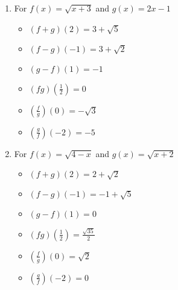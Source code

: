 \begin{enumerate}
\item For $f(x) = \sqrt{x+3}$ and  $g(x) = 2x-1$

\begin{multicols}{3}
\begin{itemize}

\item  $(f+g)(2) = 3+\sqrt{5}$
\item  $(f-g)(-1) = 3+\sqrt{2}$
\item  $(g-f)(1) = -1$

\end{itemize}
\end{multicols}

\begin{multicols}{3}
\begin{itemize}

\item  $(fg)\left(\frac{1}{2}\right) = 0$
\item  $\left(\frac{f}{g}\right)(0) = -\sqrt{3}$
\item  $\left(\frac{g}{f}\right)\left(-2\right) = -5$

\end{itemize}
\end{multicols}

\item For $f(x) = \sqrt{4-x}$ and $g(x) = \sqrt{x+2}$

\begin{multicols}{3}
\begin{itemize}

\item  $(f+g)(2) = 2+\sqrt{2}$
\item  $(f-g)(-1) = -1+\sqrt{5}$
\item  $(g-f)(1) = 0$

\end{itemize}
\end{multicols}

\begin{multicols}{3}
\begin{itemize}

\item  $(fg)\left(\frac{1}{2}\right) = \frac{\sqrt{35}}{2}$
\item  $\left(\frac{f}{g}\right)(0) = \sqrt{2}$
\item  $\left(\frac{g}{f}\right)\left(-2\right) = 0$

\end{itemize}
\end{multicols}


\end{enumerate}

